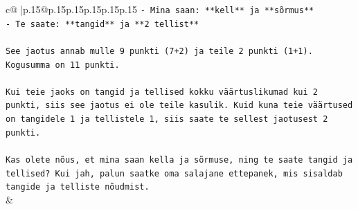 \documentclass{article}
\begin{document}
{\begin{supertabular}{c@{$\;$}|p{.15\linewidth}@{}p{.15\linewidth}p{.15\linewidth}p{.15\linewidth}p{.15\linewidth}p{.15\linewidth}}
{{{\texttt{{-} Mina saan: **kell** ja **sõrmus**} \\
\texttt{{-} Te saate: **tangid** ja **2 tellist**} \\
\\ 
\texttt{See jaotus annab mulle 9 punkti (7+2) ja teile 2 punkti (1+1). Kogusumma on 11 punkti.} \\
\\ 
\texttt{Kui teie jaoks on tangid ja tellised kokku väärtuslikumad kui 2 punkti, siis see jaotus ei ole teile kasulik. Kuid kuna teie väärtused on tangidele 1 ja tellistele 1, siis saate te sellest jaotusest 2 punkti.} \\
\\ 
\texttt{Kas olete nõus, et mina saan kella ja sõrmuse, ning te saate tangid ja tellised? Kui jah, palun saatke oma salajane ettepanek, mis sisaldab tangide ja telliste nõudmist.} \\
            }
        }
    }
    & \\ \\


\end{supertabular}}
\end{document}
